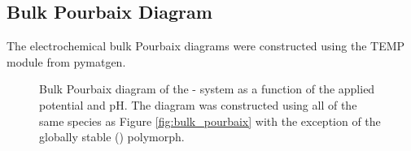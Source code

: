 \subsection{Bulk Pourbaix Diagram}  %
%
%
The electrochemical bulk Pourbaix diagrams were constructed using the TEMP module from pymatgen.


\begin{figure}[!htb]
\centering
{}
\caption{\label{fig:bulk_pourbaix_wo_alpha}
%
Bulk Pourbaix diagram of the - system as a function of the applied potential and pH.
%
The diagram was constructed using all of the same species as Figure \ref{fig:bulk_pourbaix} with the exception of the globally stable \IrOthree (\aIrOthree) polymorph.
%
%
}
\end{figure}


